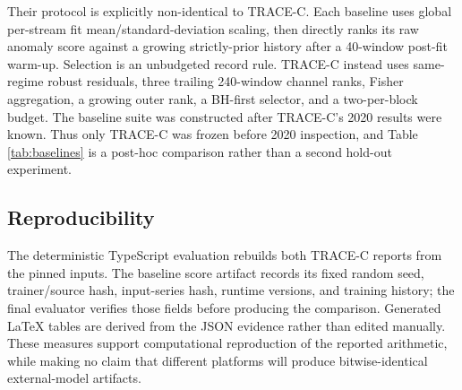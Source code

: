 Their protocol is explicitly non-identical to TRACE-C. Each baseline uses
global per-stream fit mean/standard-deviation scaling, then directly ranks its
raw anomaly score against a growing strictly-prior history after a 40-window
post-fit warm-up. Selection is an unbudgeted record rule. TRACE-C instead uses
same-regime robust residuals, three trailing 240-window channel ranks, Fisher
aggregation, a growing outer rank, a BH-first selector, and a two-per-block
budget. The baseline suite was constructed after TRACE-C's 2020 results were
known. Thus only TRACE-C was frozen before 2020 inspection, and Table
\ref{tab:baselines} is a post-hoc comparison rather than a second hold-out
experiment.

\subsection{Reproducibility}

The deterministic TypeScript evaluation rebuilds both TRACE-C reports from the
pinned inputs. The baseline score artifact records its fixed random seed,
trainer/source hash, input-series hash, runtime versions, and training history;
the final evaluator verifies those fields before producing the comparison.
Generated \LaTeX{} tables are derived from the JSON evidence rather than edited
manually. These measures support computational reproduction of the reported
arithmetic, while making no claim that different platforms will produce
bitwise-identical external-model artifacts.
